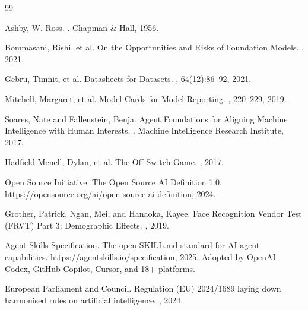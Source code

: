\documentclass[11pt,a4paper]{article}
\theoremstyle{definition}
\begin{document}


\begin{thebibliography}{99}

Ashby, W. Ross.
.
\newblock Chapman \& Hall, 1956.

Bommasani, Rishi, et al.
\newblock On the Opportunities and Risks of Foundation Models.
, 2021.

Gebru, Timnit, et al.
\newblock Datasheets for Datasets.
, 64(12):86--92, 2021.

Mitchell, Margaret, et al.
\newblock Model Cards for Model Reporting.
, 220--229, 2019.

Soares, Nate and Fallenstein, Benja.
\newblock Agent Foundations for Aligning Machine Intelligence with Human Interests.
. Machine Intelligence Research Institute, 2017.

Hadfield-Menell, Dylan, et al.
\newblock The Off-Switch Game.
, 2017.

Open Source Initiative.
\newblock The Open Source AI Definition 1.0.
\newblock \url{https://opensource.org/ai/open-source-ai-definition}, 2024.

Grother, Patrick, Ngan, Mei, and Hanaoka, Kayee.
\newblock Face Recognition Vendor Test (FRVT) Part 3: Demographic Effects.
, 2019.

Agent Skills Specification.
\newblock The open SKILL.md standard for AI agent capabilities.
\newblock \url{https://agentskills.io/specification}, 2025.
\newblock Adopted by OpenAI Codex, GitHub Copilot, Cursor, and 18+ platforms.

European Parliament and Council.
\newblock Regulation (EU) 2024/1689 laying down harmonised rules on artificial intelligence.
, 2024.


\end{thebibliography}
\end{document}
